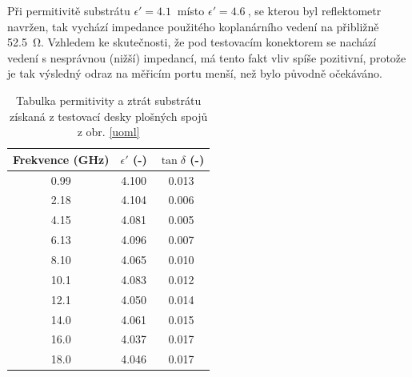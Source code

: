 Při permitivitě substrátu $\epsilon'=\SI{4.1}{}$ místo $\epsilon'=\SI{4.6}{}$, se kterou byl reflektometr navržen, tak vychází impedance použitého koplanárního vedení na přibližně \SI{52.5}{\ohm}. Vzhledem ke skutečnosti, že pod testovacím konektorem se nachází vedení s nesprávnou (nižší) impedancí, má tento fakt vliv spíše pozitivní, protože je tak výsledný odraz na měřicím portu menší, než bylo původně očekáváno.

\begin{table}[htbp]
\begin{center}
\caption{Tabulka permitivity a ztrát substrátu získaná z testovací desky plošných spojů z obr. \ref{uoml}}\label{permittivity_table}
\begin{tabular}{ |c|c|c|  }
 \hline
 Frekvence (\si{\giga\hertz}) & $\epsilon'$ (-) & $\tan \delta$ (-)\\
 \hline
 \hline
	\SI{0.99}{}	&	\SI{4.100}{}	&	\SI{0.013}{}\\
 \hline
	\SI{2.18}{}	&	\SI{4.104}{}	&	\SI{0.006}{}\\
 \hline
	\SI{4.15}{}	&	\SI{4.081}{}	&	\SI{0.005}{}\\
 \hline
	\SI{6.13}{}	&	\SI{4.096}{}	&	\SI{0.007}{}\\
 \hline
	\SI{8.10}{}	&	\SI{4.065}{}	&	\SI{0.010}{}\\
 \hline
	\SI{10.1}{}	&	\SI{4.083}{}	&	\SI{0.012}{}\\
 \hline
	\SI{12.1}{}	&	\SI{4.050}{}	&	\SI{0.014}{}\\
 \hline
	\SI{14.0}{}	&	\SI{4.061}{}	&	\SI{0.015}{}\\
 \hline
	\SI{16.0}{}	&	\SI{4.037}{}	&	\SI{0.017}{}\\
 \hline
	\SI{18.0}{}	&	\SI{4.046}{}	&	\SI{0.017}{}\\
 \hline
\end{tabular}
\end{center}
\end{table}

